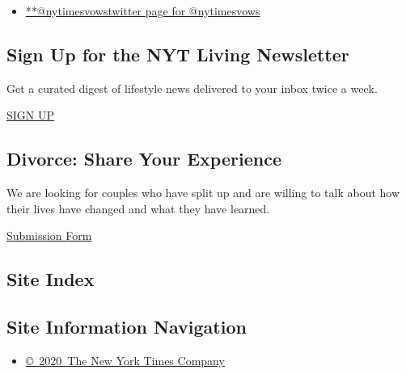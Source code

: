 \begin{itemize}
\tightlist
\item
  \href{https://twitter.com/nytimesvows}{**@nytimesvowstwitter page for
  @nytimesvows}
\end{itemize}

\hypertarget{sign-up-for-the-nyt-living-newsletter}{%
\subsection{Sign Up for the NYT Living
Newsletter}\label{sign-up-for-the-nyt-living-newsletter}}

Get a curated digest of lifestyle news delivered to your inbox twice a
week.

\href{/newsletters/signup/LI}{SIGN UP}

\hypertarget{divorce-share-your-experience}{%
\subsection{Divorce: Share Your
Experience}\label{divorce-share-your-experience}}

We are looking for couples who have split up and are willing to talk
about how their lives have changed and what they have learned.

\href{http://www.nytimes.com/interactive/2014/style/boomer-divorce.html}{Submission
Form}

\hypertarget{site-index}{%
\subsection{Site Index}\label{site-index}}

\hypertarget{site-information-navigation}{%
\subsection{Site Information
Navigation}\label{site-information-navigation}}

\begin{itemize}
\tightlist
\item
  \href{https://help.nytimes.com/hc/en-us/articles/115014792127-Copyright-notice}{©~2020~The
  New York Times Company}
\end{itemize}

